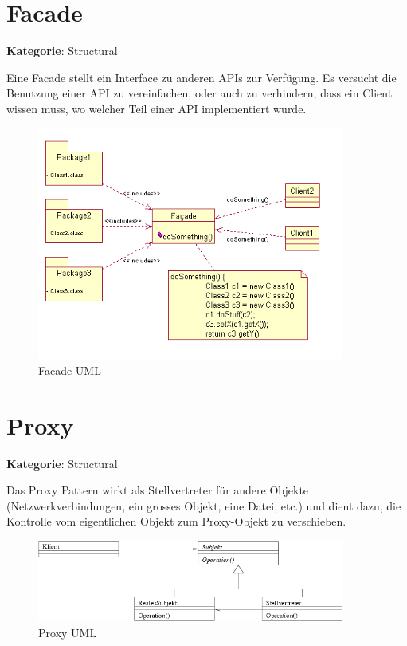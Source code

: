 \section{Facade}
\textbf{Kategorie}: Structural

Eine Facade stellt ein Interface zu anderen APIs zur Verfügung. Es versucht die Benutzung einer API zu vereinfachen, oder auch zu verhindern, dass ein Client wissen muss, wo welcher Teil einer API implementiert wurde.

\begin{figure}[H]
	\centering
	\includegraphics[width=0.9\textwidth]{content/gof/images/10-facade-uml.png}
	\caption{Facade UML}
\end{figure}


\section{Proxy}
\textbf{Kategorie}: Structural

Das Proxy Pattern wirkt als Stellvertreter für andere Objekte (Netzwerkverbindungen, ein grosses Objekt, eine Datei, etc.) und dient dazu, die Kontrolle vom eigentlichen Objekt zum Proxy-Objekt zu verschieben.

\begin{figure}[H]
	\centering
	\includegraphics[width=0.9\textwidth]{content/gof/images/11-proxy-uml.png}
	\caption{Proxy UML}
\end{figure}


